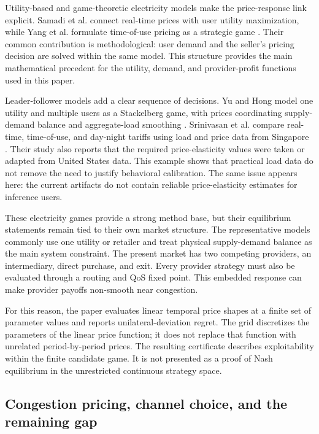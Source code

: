 \documentclass[11pt,a4paper]{article}
\begin{document}
Utility-based and game-theoretic electricity models make the price-response link explicit. Samadi et al. connect real-time prices with user utility maximization, while Yang et al. formulate time-of-use pricing as a strategic game \cite{samadi2010optimal,yang2013game}. Their common contribution is methodological: user demand and the seller's pricing decision are solved within the same model. This structure provides the main mathematical precedent for the utility, demand, and provider-profit functions used in this paper.

Leader-follower models add a clear sequence of decisions. Yu and Hong model one utility and multiple users as a Stackelberg game, with prices coordinating supply-demand balance and aggregate-load smoothing \cite{yu2016supply}. Srinivasan et al. compare real-time, time-of-use, and day-night tariffs using load and price data from Singapore \cite{srinivasan2017game}. Their study also reports that the required price-elasticity values were taken or adapted from United States data. This example shows that practical load data do not remove the need to justify behavioral calibration. The same issue appears here: the current artifacts do not contain reliable price-elasticity estimates for inference users.

These electricity games provide a strong method base, but their equilibrium statements remain tied to their own market structure. The representative models commonly use one utility or retailer and treat physical supply-demand balance as the main system constraint. The present market has two competing providers, an intermediary, direct purchase, and exit. Every provider strategy must also be evaluated through a routing and QoS fixed point. This embedded response can make provider payoffs non-smooth near congestion.

For this reason, the paper evaluates linear temporal price shapes at a finite set of parameter values and reports unilateral-deviation regret. The grid discretizes the parameters of the linear price function; it does not replace that function with unrelated period-by-period prices. The resulting certificate describes exploitability within the finite candidate game. It is not presented as a proof of Nash equilibrium in the unrestricted continuous strategy space.

\subsection{Congestion pricing, channel choice, and the remaining gap}
\end{document}
